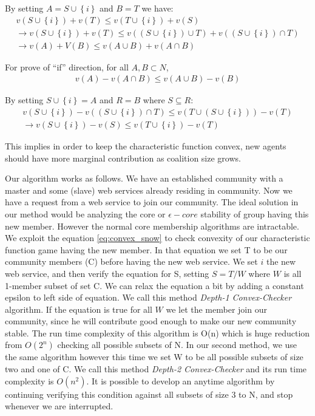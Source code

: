 \documentclass[10pt, conference, compsocconf]{IEEEtran}
\theoremstyle{plain}
\theoremstyle{definition}
\begin{document}
By setting $A = S \cup \left\{i\right\}$ and $B = T$ we have:
\setlength{\abovedisplayshortskip}{2pt}
\begin{gather*}
v(S \cup \left\{i\right\}) + v(T) \leq v (T \cup \left\{i\right\}) + v(S)
\\
\rightarrow v(S \cup \left\{i\right\}) + v(T) \leq v((S \cup \left\{i\right\}) \cup T) + v((S \cup \left\{i\right\}) \cap T)
\\
\rightarrow v(A) + V(B) \leq v(A \cup B) + v(A \cap B)
\end{gather*}

For prove of ``if'' direction, for all $A, B \subset N$,
\setlength{\abovedisplayshortskip}{2pt}
\begin{gather*}
v(A) - v(A \cap B) \leq v(A \cup B) - v(B)
\end{gather*}

By setting $S \cup \left\{i\right\} = A$ and $R = B$ where $S \subseteq R$:
\setlength{\abovedisplayshortskip}{2pt}
\begin{gather*}
v(S \cup \left\{i\right\}) - v((S \cup \left\{i\right\}) \cap T) \leq v(T \cup (S \cup \left\{i\right\})) - v(T)
\\
\rightarrow v(S \cup \left\{i\right\}) - v(S) \leq v(T \cup \left\{i\right\}) - v(T)
\end{gather*}


This implies in order to keep the characteristic function convex, new agents should have more marginal contribution as coalition size grows.

Our algorithm works as follows. We have an established community with a master and some (slave) web services already residing in community. Now we have a request from a web service to join our community. The ideal solution in our method would be analyzing the core or $\epsilon-core$ stability of group having this new member. However the normal core membership algorithms are intractable. We exploit the equation \ref{eq:convex_snow} to check convexity of our characteristic function game having the new member. In that equation we set T to be our community members (C) before having the new web service. We set ${i}$ the new web service, and then verify the equation for S, setting $ S = T / W $ where $W$ is all 1-member subset of set C. We can relax the equation a bit by adding a constant epsilon to left side of equation. We call this method \emph{Depth-1 Convex-Checker} algorithm. If the equation is true for all $W$ we let the member join our community, since he will contribute good enough to make our new community stable. The run time complexity of this algorithm is O(n) which is huge reduction from $O(2^n)$ checking all possible subsets of N. In our second method, we use the same algorithm however this time we set W to be all possible subsets of size two and one of C. We call this method \emph{Depth-2 Convex-Checker} and its run time complexity is $O(n^2)$. It is possible to develop an anytime algorithm by continuing verifying this condition against all subsets of size 3 to N, and stop whenever we are interrupted.
\end{document}
